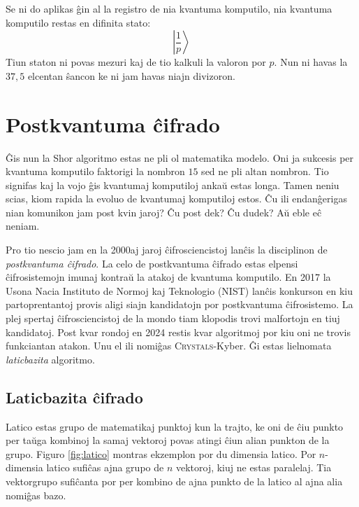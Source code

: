 \documentclass[utf8]{scrartcl}
\begin{document}
Se ni do aplikas ĝin al la registro de nia kvantuma komputilo, nia kvantuma
komputilo restas en difinita stato:
\[\left|\frac{1}{p}\right>\]
%
Tiun staton ni povas mezuri kaj de tio kalkuli la valoron por $p$. Nun ni havas
la $37,5$ elcentan ŝancon ke ni jam havas niajn divizoron.

\section{Postkvantuma ĉifrado}

Ĝis nun la Shor algoritmo estas ne pli ol matematika modelo. Oni ja sukcesis
per kvantuma komputilo faktorigi la nombron $15$ sed ne pli altan nombron. Tio
signifas kaj la vojo ĝis kvantumaj komputiloj ankaŭ estas longa. Tamen neniu
scias, kiom rapida la evoluo de kvantumaj komputiloj estos. Ĉu ili endanĝerigas
nian komunikon jam post kvin jaroj? Ĉu post dek? Ĉu dudek? Aŭ eble eĉ neniam.

Pro tio nescio jam en la 2000aj jaroj ĉifrosciencistoj lanĉis la disciplinon de
\emph{postkvantuma ĉifrado}. La celo de postkvantuma ĉifrado estas elpensi
ĉifrosistemojn imunaj kontraŭ la atakoj de kvantuma komputilo. En 2017 la Usona
Nacia Instituto de Normoj kaj Teknologio (NIST) lanĉis konkurson en kiu
partoprentantoj provis aligi siajn kandidatojn por postkvantuma
ĉifrosistemo. La plej spertaj ĉifrosciencistoj de la mondo tiam klopodis trovi
malfortojn en tiuj kandidatoj. Post kvar rondoj en 2024 restis kvar algoritmoj
por kiu oni ne trovis funkciantan atakon. Unu el ili nomiĝas
\textsc{Crystals}-Kyber. Ĝi estas lielnomata \emph{laticbazita} algoritmo.


\subsection{Laticbazita ĉifrado}

Latico estas grupo de matematikaj punktoj kun la trajto, ke oni de ĉiu punkto
per taŭga kombinoj la samaj vektoroj povas atingi ĉiun alian punkton de la
grupo. Figuro \ref{fig:latico} montras ekzemplon por du dimensia latico.  Por
$n$-dimensia latico sufiĉas ajna grupo de $n$ vektoroj, kiuj ne estas
paralelaj. Tia vektorgrupo sufiĉanta por per kombino de ajna punkto de la
latico al ajna alia nomiĝas bazo.
\end{document}
